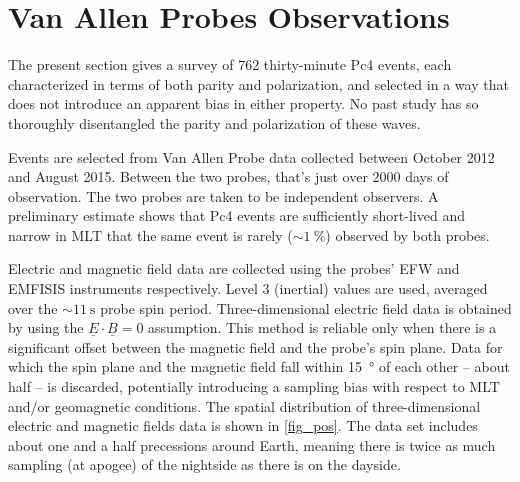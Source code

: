 \documentclass[draft,linenumbers]{agujournal}
\begin{document}

\section{Van Allen Probes Observations}

The present section gives a survey of 762 thirty-minute Pc4 events, each characterized in terms of both parity and polarization, and selected in a way that does not introduce an apparent bias in either property. No past study has so thoroughly disentangled the parity and polarization of these waves.

Events are selected from Van Allen Probe data collected between October 2012 and August 2015. Between the two probes, that's just over 2000 days of observation. The two probes are taken to be independent observers. A preliminary estimate shows that Pc4 events are sufficiently short-lived and narrow in MLT that the same event is rarely ($\sim\SI{1}{\percent}$) observed by both probes.


Electric and magnetic field data are collected using the probes' EFW\citep{wygant_2013} and EMFISIS\citep{kletzing_2013} instruments respectively. Level 3 (inertial) values are used, averaged over the $\sim\SI{11}{\second}$ probe spin period. Three-dimensional electric field data is obtained by using the $\underline{E} \cdot \underline{B} = 0$ assumption. This method is reliable only when there is a significant offset between the magnetic field and the probe's spin plane. Data for which the spin plane and the magnetic field fall within \SI{15}{\degree} of each other -- about half -- is discarded, potentially introducing a sampling bias with respect to MLT and/or geomagnetic conditions. The spatial distribution of three-dimensional electric and magnetic fields data is shown in \cref{fig_pos}. The data set includes about one and a half precessions around Earth, meaning there is twice as much sampling (at apogee) of the nightside as there is on the dayside.
\end{document}
